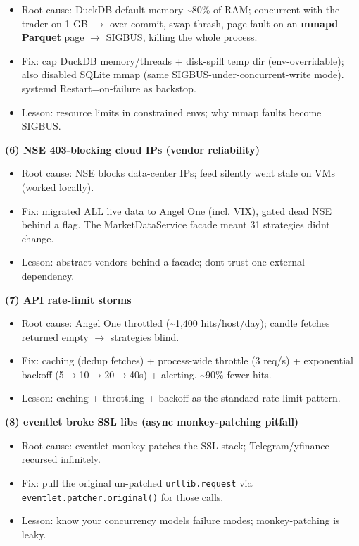 \documentclass[11pt]{article}
\providecommand{\tightlist}{\setlength{\itemsep}{1pt}\setlength{\parskip}{0pt}}
\begin{document}
\begin{itemize}
\tightlist
\item
  Root cause: DuckDB default memory \textasciitilde80\% of RAM; concurrent with the trader on 1 GB \(\rightarrow\) over-commit, swap-thrash, page fault on an \textbf{mmap\textquotesingle d Parquet} page \(\rightarrow\) SIGBUS, killing the whole process.
\item
  Fix: cap DuckDB memory/threads + disk-spill temp dir (env-overridable); also disabled SQLite mmap (same SIGBUS-under-concurrent-write mode). systemd Restart=on-failure as backstop.
\item
  Lesson: resource limits in constrained envs; why mmap faults become SIGBUS.
\end{itemize}

\textbf{(6) NSE 403-blocking cloud IPs (vendor reliability)}

\begin{itemize}
\tightlist
\item
  Root cause: NSE blocks data-center IPs; feed silently went stale on VMs (worked locally).
\item
  Fix: migrated ALL live data to Angel One (incl. VIX), gated dead NSE behind a flag. The MarketDataService facade meant 31 strategies didn\textquotesingle t change.
\item
  Lesson: abstract vendors behind a facade; don\textquotesingle t trust one external dependency.
\end{itemize}

\textbf{(7) API rate-limit storms}

\begin{itemize}
\tightlist
\item
  Root cause: Angel One throttled (\textasciitilde1,400 hits/host/day); candle fetches returned empty \(\rightarrow\) strategies blind.
\item
  Fix: caching (dedup fetches) + process-wide throttle (3 req/s) + exponential backoff (5\(\rightarrow\)10\(\rightarrow\)20\(\rightarrow\)40s) + alerting. \textasciitilde90\% fewer hits.
\item
  Lesson: caching + throttling + backoff as the standard rate-limit pattern.
\end{itemize}

\textbf{(8) eventlet broke SSL libs (async monkey-patching pitfall)}

\begin{itemize}
\tightlist
\item
  Root cause: eventlet monkey-patches the SSL stack; Telegram/yfinance recursed infinitely.
\item
  Fix: pull the original un-patched \texttt{urllib.request} via \texttt{eventlet.patcher.original()} for those calls.
\item
  Lesson: know your concurrency model\textquotesingle s failure modes; monkey-patching is leaky.
\end{itemize}
\end{document}
